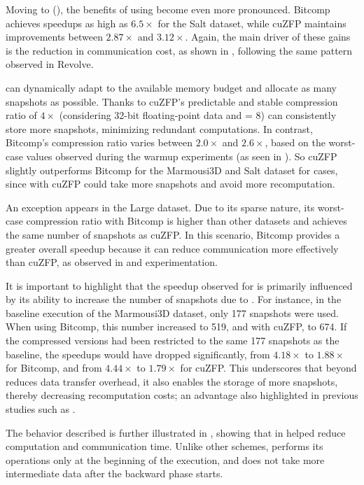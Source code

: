 \documentclass[Ingles,Final]{ic-tese-v3}
\begin{document}
Moving to \zcut (), the benefits of using \compression become even more pronounced. Bitcomp achieves speedups as high as $6.5\times$ for the Salt dataset, while cuZFP maintains improvements between $2.87\times$ and $3.12\times$. Again, the main driver of these gains is the reduction in communication cost, as shown in , following the same pattern observed in Revolve. 


 \uniform can dynamically adapt to the available memory budget and allocate as many snapshots as possible. Thanks to cuZFP's predictable and stable compression ratio of $4\times$ (considering 32-bit floating-point data and  = 8) \uniform can consistently store more snapshots, minimizing redundant computations. In contrast, Bitcomp's compression ratio varies between $2.0\times$ and $2.6\times$, based on the worst-case values observed during the warmup experiments (as seen in ). So cuZFP slightly outperforms Bitcomp for the Marmousi3D and Salt dataset for \uniform cases, since with cuZFP \uniform could take more snapshots and avoid more recomputation.

An exception appears in the Large dataset. Due to its sparse nature, its worst-case compression ratio with Bitcomp is higher than other datasets and achieves the same number of snapshots as cuZFP. In this scenario, Bitcomp provides a greater overall speedup because it can reduce communication more effectively than cuZFP, as observed in \revolve and \zcut experimentation.

It is important to highlight that the speedup observed for \uniform is primarily influenced by its ability to increase the number of snapshots due to \compression. For instance, in the baseline execution of the Marmousi3D dataset, only 177 snapshots were used. When using Bitcomp, this number increased to 519, and with cuZFP, to 674. If the compressed versions had been restricted to the same 177 snapshots as the baseline, the speedups would have dropped significantly, from $4.18\times$ to $1.88\times$ for Bitcomp, and from $4.44\times$ to $1.79\times$ for cuZFP. This underscores that beyond \compression reduces data transfer overhead, it also enables the storage of more snapshots, thereby decreasing recomputation costs; an advantage also highlighted in previous studies such as \cite{kukreja2020}.

The \uniform behavior described is further illustrated in , showing that \compression in \uniform helped reduce computation and communication time. Unlike other \checkpointing schemes, \uniform performs its \save operations only at the beginning of the execution, and does not take more intermediate data after the backward phase starts.
\end{document}
